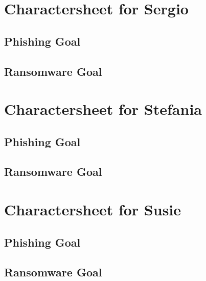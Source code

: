 \documentclass{../../extra/styles/SecureRole}
\begin{document}
\chapter{Charactersheet for Sergio}
\section{Phishing Goal}

\section{Ransomware Goal}





\chapter{Charactersheet for Stefania}
\section{Phishing Goal}

\section{Ransomware Goal}





\chapter{Charactersheet for Susie}
\section{Phishing Goal}

\section{Ransomware Goal}




\end{document}
